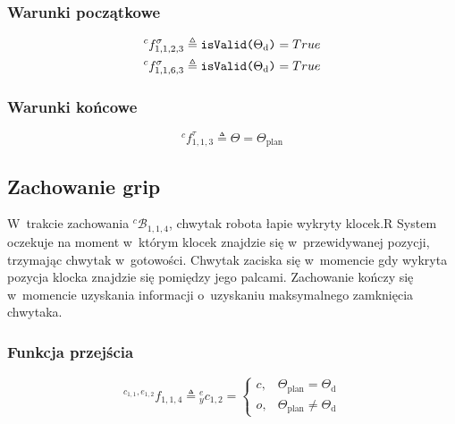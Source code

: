 \subsubsection{Warunki początkowe}
\begin{equation}
    \begin{gathered}
        {}^{c}f^{\sigma}_{1,1,2,3} \triangleq \text{\texttt{isValid($\Theta_{\mathrm{d}}$)}} = True \\
        {}^{c}f^{\sigma}_{1,1,6,3} \triangleq \text{\texttt{isValid($\Theta_{\mathrm{d}}$)}} = True        
    \end{gathered}
\end{equation}

\subsubsection{Warunki końcowe}
\begin{equation}
    {}^{c}f^{\tau}_{1,1,3} \triangleq \Theta = \Theta_{\mathrm{plan}}
\end{equation}



\subsection{Zachowanie grip}
\label{subsec:cs-grip}
W~trakcie zachowania ${}^{c}\mathcal{B}_{1,1,4}$, chwytak robota łapie wykryty klocek.R
System oczekuje na moment w~którym klocek znajdzie się w~przewidywanej pozycji, trzymając chwytak w~gotowości. Chwytak zaciska się w~momencie gdy wykryta pozycja klocka znajdzie się pomiędzy jego palcami. Zachowanie kończy się w~momencie uzyskania informacji o~uzyskaniu maksymalnego zamknięcia chwytaka.

\subsubsection{Funkcja przejścia}
\begin{equation}
    {}^{c_{1,1}, e_{1,2}}f_{1,1,4} \triangleq {}^{e}_{y}c_{1,2} = \begin{cases}
        c, & \Theta_{\mathrm{plan}} = \Theta_{\mathrm{d}}\\
        o, & \Theta_{\mathrm{plan}} \neq \Theta_{\mathrm{d}}
    \end{cases}
\end{equation}

